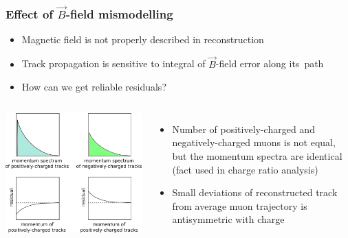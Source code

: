 \documentclass[compress]{beamer}
\begin{document}
\begin{frame}
\frametitle{Effect of $\vec{B}$-field mismodelling}

\begin{itemize}
\item Magnetic field is not properly described in reconstruction
\item Track propagation is sensitive to integral of $\vec{B}$-field error along \mbox{its path\hspace{-1 cm}}
\item How can we get reliable residuals?
\end{itemize}

\begin{columns}
\includegraphics[width=\linewidth]{momentum_explanation.png}

\vspace{-1 cm}
\begin{itemize}
\item Number of positively-charged and negatively-charged muons is not
  equal, but the momentum spectra are identical (fact used in charge
  ratio analysis)

\item Small deviations of reconstructed track from average muon
  trajectory is antisymmetric with charge
\end{itemize}
\end{columns}
\end{frame}
\end{document}
